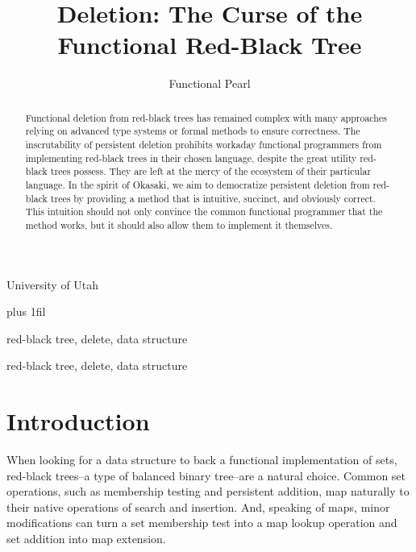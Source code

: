 \documentclass[preprint]{sigplanconf}
\begin{document}
\copyrightdata{[to be supplied]} 


\title{Deletion: The Curse of the Functional Red-Black Tree}
\subtitle{Functional Pearl}

           {University of Utah}

\maketitle

\rightcodeskip=0pt plus 1fil 

\begin{abstract}
Functional deletion from red-black trees has remained complex with many approaches relying on advanced type systems or formal methods to ensure correctness. The inscrutability of persistent deletion prohibits workaday functional programmers from implementing red-black trees in their chosen language, despite the great utility red-black trees possess. They are left at the mercy of the ecosystem of their particular language. In the spirit of Okasaki, we aim to democratize persistent deletion from red-black trees by providing a method that is intuitive, succinct, and obviously correct. This intuition should not only convince the common functional programmer that the method works, but it should also allow them to implement it themselves.
\end{abstract}


\terms
red-black tree, delete, data structure

\keywords
red-black tree, delete, data structure

\section{Introduction}

When looking for a data structure to back a functional implementation of sets, red-black trees--a type of balanced binary tree--are a natural choice. Common set operations, such as membership testing and persistent addition, map naturally to their native operations of search and insertion. And, speaking of maps, minor modifications can turn a set membership test into a map lookup operation and set addition into map extension.
\end{document}
